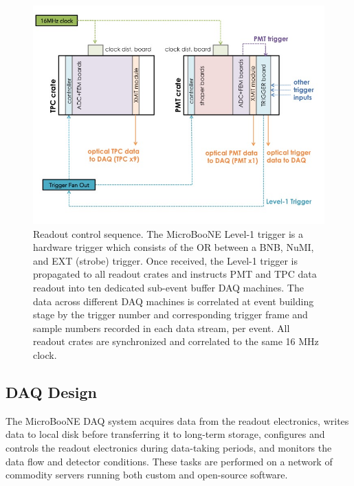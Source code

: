 \begin{figure}
\centering
\includegraphics[width=0.8\linewidth]{./figures/det_figure_10.jpg}%
\caption{\label{fig:readout_10}Readout control sequence. The MicroBooNE Level-1 trigger is a hardware trigger which consists of the OR between a BNB, NuMI, and EXT (strobe) trigger. Once received, the Level-1 trigger is propagated to all readout crates and instructs PMT and TPC data readout into ten dedicated sub-event buffer DAQ machines. The data across different DAQ machines is correlated at event building stage by the trigger number and corresponding trigger frame and sample numbers recorded in each data stream, per event. All readout crates are synchronized and correlated to the same 16 MHz clock.}
\end{figure}

%
\subsection{DAQ Design}
\label{sec:daq}
The MicroBooNE DAQ system acquires data from the readout electronics, writes data to local disk before transferring it to long-term storage, configures and controls the readout electronics during data-taking periods, and monitors the data flow and detector conditions. These tasks are performed on a network of commodity servers running both custom and open-source software.

